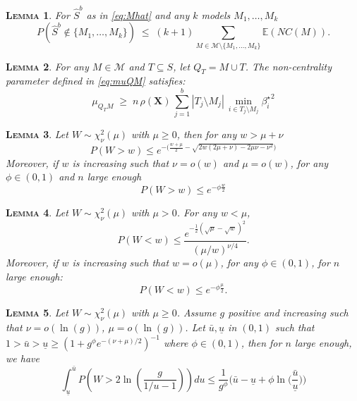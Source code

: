 \documentclass[aos]{imsart}
\theoremstyle{plain}
\newtheorem{lem}{\textsc{Lemma}}[section]
\newcommand{\E}{\mathbb{E}}
\newcommand{\M}{\mathcal{M}}
\newcommand{\bs}{\boldsymbol}
\begin{document}

\begin{lem}\label{lem:L0toL1convergencegen} For $\hat S^b$ as in \eqref{eq:Mhat} and any $k$ models $M_1,\ldots,M_k$
$$P(\hat{S}^b\not\in \{M_1,\ldots,M_k\})\;\leq\; (k+1) \sum_{M \in \M\setminus \{M_1,\ldots,M_k\}}\E\left( NC(M)\right).$$
\end{lem}

\begin{lem}\label{lem:boundrhogen}
 For any $M\in\M$ and $T\subseteq S$, let $Q_T=M \cup T$. The non-centrality parameter defined in \eqref{eq:muQM} satisfies: 
\begin{equation}
    \mu_{Q_TM}\; \geq \;n\,\rho(\bs X)\,\sum_{j=1}^b|T_j\setminus M_j|\,\min_{i\in T_j\setminus M_j}{\beta_{i}^{\star}}^2
\end{equation}
\end{lem}

\begin{lem}\label{lemma:s1s3}
Let $W\sim\chi_{\nu}^2(\mu)$ with $\mu \geq 0$, then for any $w>\mu+\nu$
$$P(W > w) \leq e^{-\big(\frac{w+\mu}{2}  - \sqrt{2w( 2 \mu+ \nu)-2 \mu \nu - \nu^2 } \big)} $$
Moreover, if $w$ is increasing such that $\nu=o(w)$ and $\mu=o(w)$, for any $\phi\in(0,1)$ and $n$ large enough
$$P(W > w)  \leq  e^{-\phi\frac{w}{2}}$$
\end{lem}

\begin{lem}\label{lemma:s2} Let $W \sim \chi_\nu^2(\mu)$ with $\mu>0$. For any $w<\mu$, 
$$
P(W<w) \leq \frac{e^{-\frac{1}{2}(\sqrt{\mu}-\sqrt{w})^2}}{(\mu / w)^{\nu / 4}}.$$
Moreover, if $w$ is increasing such that $w=o(\mu)$, for any $\phi\in(0,1)$, for $n$ large enough:
$$
P(W<w) \leq e^{-\phi\frac{\mu}{2}}.$$
\end{lem}

\begin{lem}\label{lemma:s18} 
    Let $W\sim \chi_\nu^2(\mu)$ with $\mu \geq 0$. Assume $g$ positive and increasing such that $\nu=o(\ln(g))$, $\mu=o(\ln(g))$. Let $\bar{u},\underline{u}$ in $(0,1)$ such that $1>\bar{u}>\underline{u}\geq\left(1+g^{\phi}e^{-(\nu+\mu)/2}\right)^{-1}$ where $\phi\in(0,1)$, then for $n$ large enough, we have
$$
\int_{\underline{u}}^{\bar{u}} P\left(W>2\ln \left(\frac{g}{1 / u-1}\right)\right) d u \leq  \frac{1}{g^{\phi}}\Big(\bar{u}-\underline{u}+\phi\ln\Big(\frac{\bar{u}}{\underline{u}}\Big)\Big)
$$

\end{lem}
\end{document}
